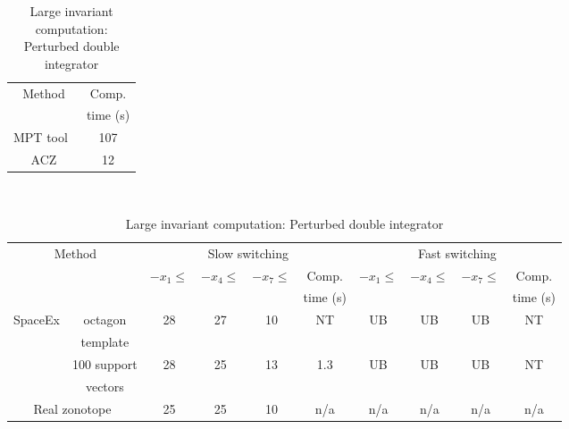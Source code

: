 \begin{table}
\begin{minipage}{0.4\textwidth}
\begin{tabular}{|c|c|}
\hline
\multirow{2}{*}{Method} & Comp.\\
& time (s)\\
\hline
\multirow{2}{*}{MPT tool~\cite{rakovic2004computation}} & \multirow{2}{*}{107}\\
& \\
\hline
\multirow{2}{*}{ACZ} & \multirow{2}{*}{12}\\
& \\
\hline
\end{tabular}
\caption{Large invariant computation: Perturbed double integrator}
~\label{tab:largeinv-pdi}
\end{minipage}

\begin{tabular}{|l|c|c|c|c|c|c|c|c|c|}
\hline
\multicolumn{2}{|c|}{\multirow{4}{*}{Method}} & \multicolumn{4}{|c|}{\multirow{2}{*}{Slow switching}} & \multicolumn{4}{|c|}{\multirow{2}{*}{Fast switching}}\\
\multicolumn{2}{|c|}{} & \multicolumn{4}{|c|}{} & \multicolumn{4}{|c|}{} \\
\cline{3-10}
\multicolumn{2}{|c|}{} & \multirow{2}{*}{$-x_1\leq$} & \multirow{2}{*}{$-x_4\leq$} & \multirow{2}{*}{$-x_7\leq$} & Comp. & \multirow{2}{*}{$-x_1\leq$} & \multirow{2}{*}{$-x_4\leq$} & \multirow{2}{*}{$-x_7\leq$} & Comp.\\
\multicolumn{2}{|c|}{} & & & & time (s) & & & & time (s)\\
\hline
\multirow{4}{*}{SpaceEx} & octagon & \multirow{2}{*}{28} &
\multirow{2}{*}{27} & \multirow{2}{*}{10} &
\multirow{2}{*}{NT} & \multirow{2}{*}{UB} &
\multirow{2}{*}{UB} & \multirow{2}{*}{UB} &
\multirow{2}{*}{NT}\\
& template & & & & & & & &\\
\cline{2-10}
& 100 support & \multirow{2}{*}{28} & \multirow{2}{*}{25} &
\multirow{2}{*}{13} & \multirow{2}{*}{1.3} & \multirow{2}{*}{UB} & \multirow{2}{*}{UB} &
\multirow{2}{*}{UB} & \multirow{2}{*}{NT}\\
& vectors & & & & & & & &\\
\hline
\multicolumn{2}{|c|}{\multirow{2}{*}{Real zonotope~\cite{makhlouf2014networked}}} &
\multirow{2}{*}{25} & \multirow{2}{*}{25} & \multirow{2}{*}{10}
 & \multirow{2}{*}{n/a} & \multirow{2}{*}{n/a} & \multirow{2}{*}{n/a} & \multirow{2}{*}{n/a}
 & \multirow{2}{*}{n/a}\\
\multicolumn{2}{|c|}{} & & & & & & & &\\

\end{tabular}
\end{table}
